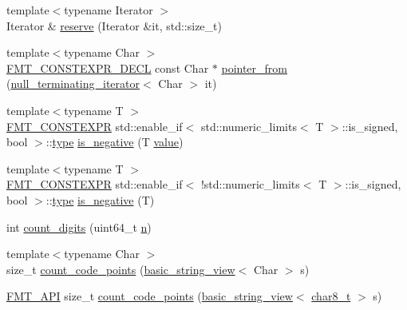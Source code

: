 \begin{DoxyCompactItemize}
\item 
{\footnotesize template$<$typename Iterator $>$ }\\Iterator \& \hyperlink{namespaceinternal_a4200c951ca5aabed226d4bd926103ed2}{reserve} (Iterator \&it, std\+::size\+\_\+t)
\item 
{\footnotesize template$<$typename Char $>$ }\\\hyperlink{core_8h_af4388801466a5994a363d6005616371a}{F\+M\+T\+\_\+\+C\+O\+N\+S\+T\+E\+X\+P\+R\+\_\+\+D\+E\+CL} const Char $\ast$ \hyperlink{namespaceinternal_a1c1f62847a38000abb38914d5a42ae9f}{pointer\+\_\+from} (\hyperlink{classinternal_1_1null__terminating__iterator}{null\+\_\+terminating\+\_\+iterator}$<$ Char $>$ it)
\item 
{\footnotesize template$<$typename T $>$ }\\\hyperlink{core_8h_a69201cb276383873487bf68b4ef8b4cd}{F\+M\+T\+\_\+\+C\+O\+N\+S\+T\+E\+X\+PR} std\+::enable\+\_\+if$<$ std\+::numeric\+\_\+limits$<$ T $>$\+::is\+\_\+signed, bool $>$\+::\hyperlink{namespaceinternal_a8661864098ac0acff9a6dd7e66f59038}{type} \hyperlink{namespaceinternal_ac5822d6a6cf07ba173eae0ab2c53bf8c}{is\+\_\+negative} (T \hyperlink{classinternal_1_1value}{value})
\item 
{\footnotesize template$<$typename T $>$ }\\\hyperlink{core_8h_a69201cb276383873487bf68b4ef8b4cd}{F\+M\+T\+\_\+\+C\+O\+N\+S\+T\+E\+X\+PR} std\+::enable\+\_\+if$<$ !std\+::numeric\+\_\+limits$<$ T $>$\+::is\+\_\+signed, bool $>$\+::\hyperlink{namespaceinternal_a8661864098ac0acff9a6dd7e66f59038}{type} \hyperlink{namespaceinternal_aa00077c2110a0a398515e1da90b99fa7}{is\+\_\+negative} (T)
\item 
int \hyperlink{namespaceinternal_a24a563e36236186f38e75ecf47a819ea}{count\+\_\+digits} (uint64\+\_\+t \hyperlink{format_8h_a9ab7e5832cef391eb8b1505a601fb215}{n})
\item 
{\footnotesize template$<$typename Char $>$ }\\size\+\_\+t \hyperlink{namespaceinternal_a6bf28ac9489563e7fcb2a24eabc51502}{count\+\_\+code\+\_\+points} (\hyperlink{classbasic__string__view}{basic\+\_\+string\+\_\+view}$<$ Char $>$ s)
\item 
\hyperlink{core_8h_a9a4960b70582ed2620911a0b75dce0b5}{F\+M\+T\+\_\+\+A\+PI} size\+\_\+t \hyperlink{namespaceinternal_a4482dd4f8307cd67b97c0c5ac41e5c6a}{count\+\_\+code\+\_\+points} (\hyperlink{classbasic__string__view}{basic\+\_\+string\+\_\+view}$<$ \hyperlink{format_8h_ad71c872603735b57c8417f76de44077b}{char8\+\_\+t} $>$ s)

\end{DoxyCompactItemize}
